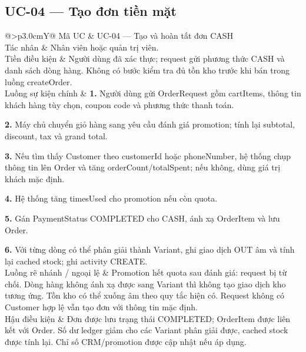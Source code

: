 \documentclass[12pt,a4paper,oneside]{report}
\makeatletter
\newcommand{\UC}[6]{%
\par\medskip\noindent\begin{tabularx}{\textwidth}{@{}>{\bfseries\color{navy}}p{3.0cm}Y@{}}\toprule
Mã UC & #1\\
Tác nhân & #2\\
Tiền điều kiện & #3\\
Luồng sự kiện chính & #4\\
Luồng rẽ nhánh / ngoại lệ & #5\\
Hậu điều kiện & #6\\
\bottomrule\end{tabularx}\par\smallskip
}
\makeatother
\begin{document}
\subsection{UC-04 — Tạo đơn tiền mặt}
\UC{UC-04 — Tạo và hoàn tất đơn CASH}{Nhân viên hoặc quản trị viên.}{Người dùng đã xác thực; request gửi phương thức CASH và danh sách dòng hàng. Không có bước kiểm tra đủ tồn kho trước khi bán trong luồng createOrder.}{\textbf{1.} Người dùng gửi OrderRequest gồm cartItems, thông tin khách hàng tùy chọn, coupon code và phương thức thanh toán.\par\textbf{2.} Máy chủ chuyển giỏ hàng sang yêu cầu đánh giá promotion; tính lại subtotal, discount, tax và grand total.\par\textbf{3.} Nếu tìm thấy Customer theo customerId hoặc phoneNumber, hệ thống chụp thông tin lên Order và tăng orderCount/totalSpent; nếu không, dùng giá trị khách mặc định.\par\textbf{4.} Hệ thống tăng timesUsed cho promotion nếu còn quota.\par\textbf{5.} Gán PaymentStatus COMPLETED cho CASH, ánh xạ OrderItem và lưu Order.\par\textbf{6.} Với từng dòng có thể phân giải thành Variant, ghi giao dịch OUT âm và tính lại cached stock; ghi activity CREATE.}{Promotion hết quota sau đánh giá: request bị từ chối. Dòng hàng không ánh xạ được sang Variant thì không tạo giao dịch kho tương ứng. Tồn kho có thể xuống âm theo quy tắc hiện có. Request không có Customer hợp lệ vẫn tạo đơn với thông tin mặc định.}{Đơn được lưu trạng thái COMPLETED; OrderItem được liên kết với Order. Số dư ledger giảm cho các Variant phân giải được, cached stock được tính lại. Chỉ số CRM/promotion được cập nhật nếu áp dụng.}
\end{document}
